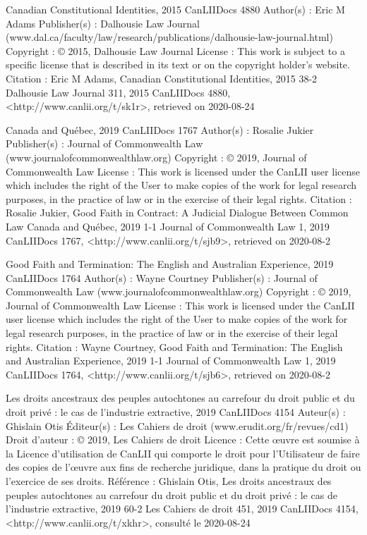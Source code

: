 Canadian Constitutional Identities, 2015 CanLIIDocs 4880
Author(s) : 	Eric M Adams
Publisher(s) : 	Dalhousie Law Journal (www.dal.ca/faculty/law/research/publications/dalhousie-law-journal.html)
Copyright : 	© 2015, Dalhousie Law Journal
License : 	This work is subject to a specific license that is described in its text or on the copyright holder's website.
Citation : 	Eric M Adams, Canadian Constitutional Identities, 2015 38-2 Dalhousie Law Journal 311, 2015 CanLIIDocs 4880, <http://www.canlii.org/t/sk1r>, retrieved on 2020-08-24



Canada and Québec, 2019 CanLIIDocs 1767
Author(s) : 	Rosalie Jukier
Publisher(s) : 	Journal of Commonwealth Law (www.journalofcommonwealthlaw.org)
Copyright : 	© 2019, Journal of Commonwealth Law
License : 	This work is licensed under the CanLII user license which includes the right of the User to make copies of the work for legal research purposes, in the practice of law or in the exercise of their legal rights.
Citation : 	Rosalie Jukier, Good Faith in Contract: A Judicial Dialogue Between Common Law Canada and Québec, 2019 1-1 Journal of Commonwealth Law 1, 2019 CanLIIDocs 1767, <http://www.canlii.org/t/sjb9>, retrieved on 2020-08-2


Good Faith and Termination: The English and Australian Experience, 2019 CanLIIDocs 1764
Author(s) : 	Wayne Courtney
Publisher(s) : 	Journal of Commonwealth Law (www.journalofcommonwealthlaw.org)
Copyright : 	© 2019, Journal of Commonwealth Law
License : 	This work is licensed under the CanLII user license which includes the right of the User to make copies of the work for legal research purposes, in the practice of law or in the exercise of their legal rights.
Citation : 	Wayne Courtney, Good Faith and Termination: The English and Australian Experience, 2019 1-1 Journal of Commonwealth Law 1, 2019 CanLIIDocs 1764, <http://www.canlii.org/t/sjb6>, retrieved on 2020-08-2


Les droits ancestraux des peuples autochtones au carrefour du droit public et du droit privé : le cas de l’industrie extractive, 2019 CanLIIDocs 4154
Auteur(s) : 	Ghislain Otis
Éditeur(s) : 	Les Cahiers de droit (www.erudit.org/fr/revues/cd1)
Droit d'auteur : 	© 2019, Les Cahiers de droit
Licence : 	Cette œuvre est soumise à la Licence d’utilisation de CanLII qui comporte le droit pour l’Utilisateur de faire des copies de l’œuvre aux fins de recherche juridique, dans la pratique du droit ou l’exercice de ses droits.
Référence : 	Ghislain Otis, Les droits ancestraux des peuples autochtones au carrefour du droit public et du droit privé : le cas de l’industrie extractive, 2019 60-2 Les Cahiers de droit 451, 2019 CanLIIDocs 4154, <http://www.canlii.org/t/xkhr>, consulté le 2020-08-24


